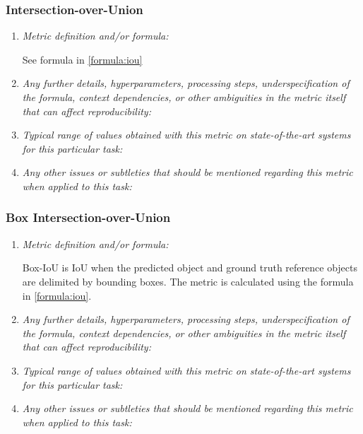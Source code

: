 \documentclass[a4paper,11pt]{article}
\begin{document}
        \subsubsection{Intersection-over-Union}
            \begin{enumerate}[label=\alph*.]
                \item \textit{Metric definition and/or formula:}

                See formula in \ref{formula:iou}
                \bigskip
                \item \textit{Any further details, hyperparameters, processing steps, underspecification of the formula, context dependencies, or other ambiguities in the metric itself that can affect reproducibility:}
                \bigskip
                \item \textit{Typical range of values obtained with this metric on state-of-the-art systems for this particular task:}
                \bigskip
                \item \textit{Any other issues or subtleties that should be mentioned regarding this metric when applied to this task:}
                \bigskip
            \end{enumerate}

        \subsubsection{Box Intersection-over-Union}
            \begin{enumerate}[label=\alph*.]
                \item \textit{Metric definition and/or formula:}

                Box-IoU is IoU when the predicted object and ground truth reference objects are delimited by bounding boxes. The metric is calculated using the formula in \ref{formula:iou}.
                \bigskip
                \item \textit{Any further details, hyperparameters, processing steps, underspecification of the formula, context dependencies, or other ambiguities in the metric itself that can affect reproducibility:}
                \bigskip
                \item \textit{Typical range of values obtained with this metric on state-of-the-art systems for this particular task:}
                \bigskip
                \item \textit{Any other issues or subtleties that should be mentioned regarding this metric when applied to this task:}
                \bigskip
            \end{enumerate}
\end{document}
